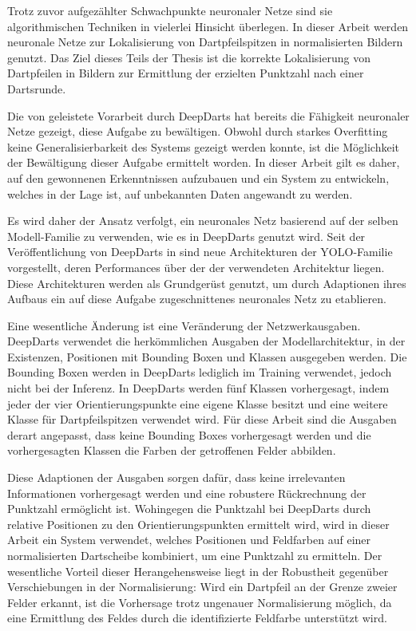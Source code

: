 Trotz zuvor aufgezählter Schwachpunkte neuronaler Netze sind sie algorithmischen Techniken in vielerlei Hinsicht überlegen. In dieser Arbeit werden neuronale Netze zur Lokalisierung von Dartpfeilspitzen in normalisierten Bildern genutzt. Das Ziel dieses Teils der Thesis ist die korrekte Lokalisierung von Dartpfeilen in Bildern zur Ermittlung der erzielten Punktzahl nach einer Dartsrunde.

Die von \citeauthor{deepdarts} geleistete Vorarbeit durch DeepDarts hat bereits die Fähigkeit neuronaler Netze gezeigt, diese Aufgabe zu bewältigen. Obwohl durch starkes Overfitting keine Generalisierbarkeit des Systems gezeigt werden konnte, ist die Möglichkeit der Bewältigung dieser Aufgabe ermittelt worden. In dieser Arbeit gilt es daher, auf den gewonnenen Erkenntnissen aufzubauen und ein System zu entwickeln, welches in der Lage ist, auf unbekannten Daten angewandt zu werden.

Es wird daher der Ansatz verfolgt, ein neuronales Netz basierend auf der selben Modell-Familie zu verwenden, wie es in DeepDarts genutzt wird. Seit der Veröffentlichung von DeepDarts in \citeyear{deepdarts} sind neue Architekturen der YOLO-Familie vorgestellt, deren Performances über der der verwendeten Architektur liegen. Diese Architekturen werden als Grundgerüst genutzt, um durch Adaptionen ihres Aufbaus ein auf diese Aufgabe zugeschnittenes neuronales Netz zu etablieren.

Eine wesentliche Änderung ist eine Veränderung der Netzwerkausgaben. DeepDarts verwendet die herkömmlichen Ausgaben der Modellarchitektur, in der Existenzen, Positionen mit Bounding Boxen und Klassen ausgegeben werden. Die Bounding Boxen werden in DeepDarts lediglich im Training verwendet, jedoch nicht bei der Inferenz. In DeepDarts werden fünf Klassen vorhergesagt, indem jeder der vier Orientierungspunkte eine eigene Klasse besitzt und eine weitere Klasse für Dartpfeilspitzen verwendet wird. Für diese Arbeit sind die Ausgaben derart angepasst, dass keine Bounding Boxes vorhergesagt werden und die vorhergesagten Klassen die Farben der getroffenen Felder abbilden.

Diese Adaptionen der Ausgaben sorgen dafür, dass keine irrelevanten Informationen vorhergesagt werden und eine robustere Rückrechnung der Punktzahl ermöglicht ist. Wohingegen die Punktzahl bei DeepDarts durch relative Positionen zu den Orientierungspunkten ermittelt wird, wird in dieser Arbeit ein System verwendet, welches Positionen und Feldfarben auf einer normalisierten Dartscheibe kombiniert, um eine Punktzahl zu ermitteln. Der wesentliche Vorteil dieser Herangehensweise liegt in der Robustheit gegenüber Verschiebungen in der Normalisierung: Wird ein Dartpfeil an der Grenze zweier Felder erkannt, ist die Vorhersage trotz ungenauer Normalisierung möglich, da eine Ermittlung des Feldes durch die identifizierte Feldfarbe unterstützt wird.

